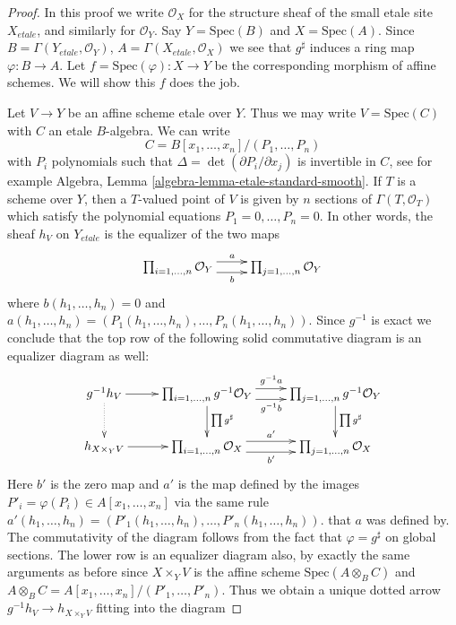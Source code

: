 \begin{proof}
In this proof we write $\mathcal{O}_X$ for the structure sheaf
of the small etale site $X_{etale}$, and similarly for $\mathcal{O}_Y$.
Say $Y = \text{Spec}(B)$ and $X = \text{Spec}(A)$. Since
$B = \Gamma(Y_{etale}, \mathcal{O}_Y)$,
$A = \Gamma(X_{etale}, \mathcal{O}_X)$
we see that $g^\sharp$ induces a ring map $\varphi : B \to A$.
Let $f = \text{Spec}(\varphi) : X \to Y$ be the corresponding morphism
of affine schemes. We will show this $f$ does the job.

\medskip\noindent
Let $V \to Y$ be an affine scheme etale over $Y$. Thus we may write
$V = \text{Spec}(C)$ with $C$ an etale $B$-algebra. We can write
$$
C = B[x_1, \ldots, x_n]/(P_1, \ldots, P_n)
$$
with $P_i$ polynomials such that $\Delta = \det(\partial P_i/ \partial x_j)$
is invertible in $C$, see for example
Algebra, Lemma \ref{algebra-lemma-etale-standard-smooth}.
If $T$ is a scheme over $Y$, then a $T$-valued point of $V$ is given by
$n$ sections of $\Gamma(T, \mathcal{O}_T)$ which satisfy the polynomial
equations $P_1 = 0, \ldots, P_n = 0$. In other words, the sheaf $h_V$
on $Y_{etale}$ is the equalizer of the two maps
$$
\xymatrix{
\prod\nolimits_{i = 1, \ldots, n} \mathcal{O}_Y 
\ar@<1ex>[r]^a \ar@<-1ex>[r]_b &
\prod\nolimits_{j = 1, \ldots, n} \mathcal{O}_Y 
}
$$
where $b(h_1, \ldots, h_n) = 0$ and
$a(h_1, \ldots, h_n) =
(P_1(h_1, \ldots, h_n), \ldots, P_n(h_1, \ldots, h_n))$.
Since $g^{-1}$ is exact we conclude that the top row of the
following solid commutative diagram is an equalizer diagram as well:
$$
\xymatrix{
g^{-1}h_V \ar[r] \ar@{..>}[d] &
\prod\nolimits_{i = 1, \ldots, n} g^{-1}\mathcal{O}_Y 
\ar@<1ex>[r]^{g^{-1}a} \ar@<-1ex>[r]_{g^{-1}b} \ar[d]^{\prod g^\sharp} &
\prod\nolimits_{j = 1, \ldots, n} g^{-1}\mathcal{O}_Y \ar[d]^{\prod g^\sharp}\\
h_{X \times_Y V} \ar[r] &
\prod\nolimits_{i = 1, \ldots, n} \mathcal{O}_X
\ar@<1ex>[r]^{a'} \ar@<-1ex>[r]_{b'} &
\prod\nolimits_{j = 1, \ldots, n} \mathcal{O}_X  \\
}
$$
Here $b'$ is the zero map and $a'$ is the map defined by the
images $P'_i = \varphi(P_i) \in A[x_1, \ldots, x_n]$ via the same
rule
$a'(h_1, \ldots, h_n) =
(P'_1(h_1, \ldots, h_n), \ldots, P'_n(h_1, \ldots, h_n))$.
that $a$ was defined by. The commutativity of the diagram follows from
the fact that $\varphi = g^\sharp$ on global sections. The lower
row is an equalizer diagram also, by exactly the same arguments as
before since $X \times_Y V$ is the affine scheme
$\text{Spec}(A \otimes_B C)$ and
$A \otimes_B C = A[x_1, \ldots, x_n]/(P'_1, \ldots, P'_n)$.
Thus we obtain a unique dotted arrow
$g^{-1}h_V \to h_{X \times_Y V}$ fitting into the diagram


\end{proof}
